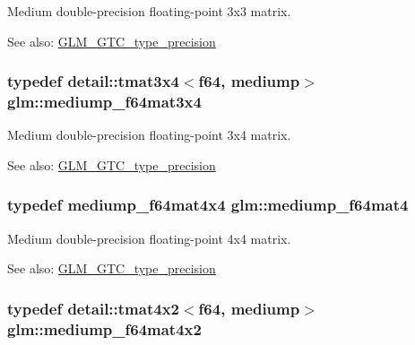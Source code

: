Medium double-precision floating-point 3x3 matrix. \begin{Desc}
\item[See also:]\hyperlink{group__gtc__type__precision}{GLM\_\-GTC\_\-type\_\-precision} \end{Desc}
\hypertarget{group__gtc__type__precision_gc3b0ca6d79631a2480cee8897dcd79ec}{
\subsubsection[mediump\_\-f64mat3x4]{\setlength{\rightskip}{0pt plus 5cm}typedef detail::tmat3x4$<$f64, mediump$>$ {\bf glm::mediump\_\-f64mat3x4}}}
\label{group__gtc__type__precision_gc3b0ca6d79631a2480cee8897dcd79ec}


Medium double-precision floating-point 3x4 matrix. \begin{Desc}
\item[See also:]\hyperlink{group__gtc__type__precision}{GLM\_\-GTC\_\-type\_\-precision} \end{Desc}
\hypertarget{group__gtc__type__precision_g2763f655bfe2141a014e66d26a9d2f18}{
\subsubsection[mediump\_\-f64mat4]{\setlength{\rightskip}{0pt plus 5cm}typedef mediump\_\-f64mat4x4 {\bf glm::mediump\_\-f64mat4}}}
\label{group__gtc__type__precision_g2763f655bfe2141a014e66d26a9d2f18}


Medium double-precision floating-point 4x4 matrix. \begin{Desc}
\item[See also:]\hyperlink{group__gtc__type__precision}{GLM\_\-GTC\_\-type\_\-precision} \end{Desc}
\hypertarget{group__gtc__type__precision_g4a7a2b6889f08c9209a4f994fd87cc4e}{
\subsubsection[mediump\_\-f64mat4x2]{\setlength{\rightskip}{0pt plus 5cm}typedef detail::tmat4x2$<$f64, mediump$>$ {\bf glm::mediump\_\-f64mat4x2}}}
\label{group__gtc__type__precision_g4a7a2b6889f08c9209a4f994fd87cc4e}


